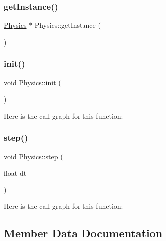 \subsubsection{\texorpdfstring{get\+Instance()}{getInstance()}}
{\footnotesize\ttfamily \hyperlink{class_mason_1_1_physics}{Physics} $\ast$ Physics\+::get\+Instance (\begin{DoxyParamCaption}{ }\end{DoxyParamCaption})\hspace{0.3cm}{\ttfamily [static]}}

\hypertarget{class_mason_1_1_physics_abc4560255c493a7fd543dd6730e4f826}{}\label{class_mason_1_1_physics_abc4560255c493a7fd543dd6730e4f826} 
\subsubsection{\texorpdfstring{init()}{init()}}
{\footnotesize\ttfamily void Physics\+::init (\begin{DoxyParamCaption}{ }\end{DoxyParamCaption})}

Here is the call graph for this function\+:
\hypertarget{class_mason_1_1_physics_ad625f1dea595f7b723003d54f997a518}{}\label{class_mason_1_1_physics_ad625f1dea595f7b723003d54f997a518} 
\subsubsection{\texorpdfstring{step()}{step()}}
{\footnotesize\ttfamily void Physics\+::step (\begin{DoxyParamCaption}\item[{float}]{dt }\end{DoxyParamCaption})}

Here is the call graph for this function\+:


\subsection{Member Data Documentation}
\hypertarget{class_mason_1_1_physics_a43a4f23b2ee62ad20c3ed54a7c75a468}{}\label{class_mason_1_1_physics_a43a4f23b2ee62ad20c3ed54a7c75a468} 
